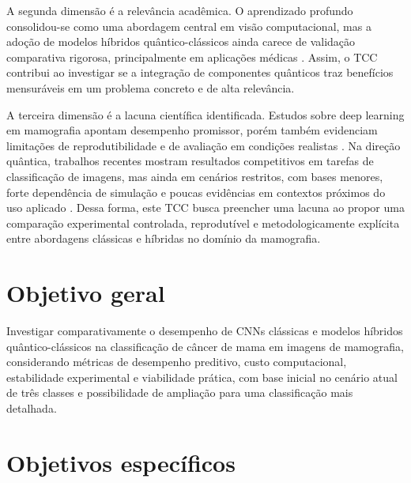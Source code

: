 \documentclass[
    12pt,
    openright,
    oneside,
    a4paper,
    english,
    brazil
]{abntex2}
\begin{document}
A segunda dimensão é a relevância acadêmica. O aprendizado profundo consolidou-se como uma abordagem central em visão computacional, mas a adoção de modelos híbridos quântico-clássicos ainda carece de validação comparativa rigorosa, principalmente em aplicações médicas \cite{LeCun2015,Gupta2025QMLDigitalHealth}. Assim, o TCC contribui ao investigar se a integração de componentes quânticos traz benefícios mensuráveis em um problema concreto e de alta relevância.

A terceira dimensão é a lacuna científica identificada. Estudos sobre deep learning em mamografia apontam desempenho promissor, porém também evidenciam limitações de reprodutibilidade e de avaliação em condições realistas \cite{Bhalla2023MammographyReview}. Na direção quântica, trabalhos recentes mostram resultados competitivos em tarefas de classificação de imagens, mas ainda em cenários restritos, com bases menores, forte dependência de simulação e poucas evidências em contextos próximos do uso aplicado \cite{Long2025QCQCNN}. Dessa forma, este TCC busca preencher uma lacuna ao propor uma comparação experimental controlada, reprodutível e metodologicamente explícita entre abordagens clássicas e híbridas no domínio da mamografia.



\section{Objetivo geral}

Investigar comparativamente o desempenho de CNNs clássicas e modelos híbridos quântico-clássicos na classificação de câncer de mama em imagens de mamografia, considerando métricas de desempenho preditivo, custo computacional, estabilidade experimental e viabilidade prática, com base inicial no cenário atual de três classes e possibilidade de ampliação para uma classificação mais detalhada.


\section{Objetivos específicos}
\end{document}
